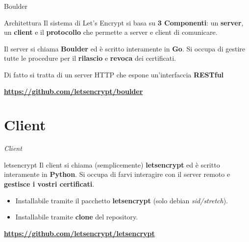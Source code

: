 \documentclass[xcolor=svgnames,11pt]{beamer}
\begin{document}
\begin{frame}{Boulder}
\begin{block}{Architettura}
Il sistema di Let's Encrypt si basa su \textbf{3 Componenti}: un \textbf{server},
un \textbf{client} e il \textbf{protocollo} che permette a server e client di comunicare.
\end{block}

\medskip \pause

Il server si chiama \textbf{Boulder} ed è scritto interamente in \textbf{Go}.
Si occupa di gestire tutte le procedure per il \textbf{rilascio} e \textbf{revoca} dei certificati.

\medskip \pause

Di fatto si tratta di un server HTTP che espone un'interfaccia \textbf{RESTful}

\medskip \pause

\begin{center}
 \textbf{\url{https://github.com/letsencrypt/boulder}}
\end{center}
\end{frame}

\section{Client}
\begin{frame}{}
\begin{center}
\begin{Huge}
\textcolor{leorange}{\emph{Client}}
\end{Huge}
\end{center}
\end{frame}



\begin{frame}{letsencrypt}
Il client si chiama (semplicemente) \textbf{letsencrypt} ed è scritto interamente in \textbf{Python}.
Si occupa di farvi interagire con il server remoto e \textbf{gestisce i vostri certificati}.
\pause
\begin{itemize}
  \item Installabile tramite il pacchetto \textbf{letsencrypt} (solo debian \emph{sid/stretch}).
  \item Installabile tramite \textbf{clone} del repository.
\end{itemize}
\pause
\begin{center}
 \textbf{\url{https://github.com/letsencrypt/letsencrypt}}
\end{center}
\end{frame}
\end{document}
